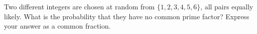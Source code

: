 Two different integers are chosen at random from $\{1,2,3,4,5,6\}$, all pairs equally likely. What is the probability that they have no common prime factor? Express your answer as a common fraction.
